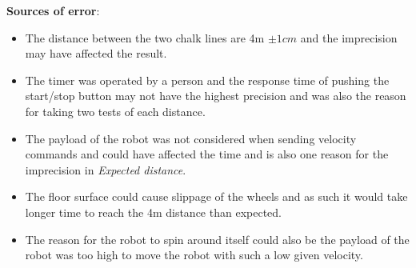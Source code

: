 \textbf{Sources of error}:
\begin{itemize}
    \item The distance between the two chalk lines are 4m $\pm 1cm$ and the imprecision may have affected the result.
    \item The timer was operated by a person and the response time of pushing the start/stop button may not have the highest precision and was also the reason for taking two tests of each distance.
    \item The payload of the robot was not considered when sending velocity commands and could have affected the time and is also one reason for the imprecision in \textit{Expected distance}.
    \item The floor surface could cause slippage of the wheels and as such it would take longer time to reach the 4m distance than expected.
    \item The reason for the robot to spin around itself could also be the payload of the robot was too high to move the robot with such a low given velocity.
\end{itemize}